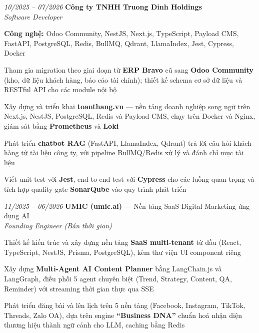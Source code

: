 \begin{twocolentry}{\textit{10/2025 -- 07/2026}}
    \textbf{Công ty TNHH Truong Dinh Holdings} \\[4pt]
    \textit{Software Developer}
\end{twocolentry}
\begin{onecolentry}
    \begin{highlights}
        \item \textbf{Công nghệ:} Odoo Community, NestJS, Next.js, TypeScript, Payload CMS, FastAPI, PostgreSQL, Redis, BullMQ, Qdrant, LlamaIndex, Jest, Cypress, Docker
        \item Tham gia migration theo giai đoạn từ \textbf{ERP Bravo} cũ sang \textbf{Odoo Community} (kho, dữ liệu khách hàng, báo cáo tài chính); thiết kế schema cơ sở dữ liệu và RESTful API cho các module nội bộ
        \item Xây dựng và triển khai \textbf{toanthang.vn} --- nền tảng doanh nghiệp song ngữ trên Next.js, NestJS, PostgreSQL, Redis và Payload CMS, chạy trên Docker và Nginx, giám sát bằng \textbf{Prometheus} và \textbf{Loki}
        \item Phát triển \textbf{chatbot RAG} (FastAPI, LlamaIndex, Qdrant) trả lời câu hỏi khách hàng từ tài liệu công ty, với pipeline BullMQ/Redis xử lý và đánh chỉ mục tài liệu
        \item Viết unit test với \textbf{Jest}, end-to-end test với \textbf{Cypress} cho các luồng quan trọng và tích hợp quality gate \textbf{SonarQube} vào quy trình phát triển
    \end{highlights}
\end{onecolentry}
\vspace{0.2 cm}

\begin{twocolentry}{\textit{11/2025 -- 06/2026}}
    \textbf{UMIC (umic.ai)} --- Nền tảng SaaS Digital Marketing ứng dụng AI \\[4pt]
    \textit{Founding Engineer (Bán thời gian)}
\end{twocolentry}
\begin{onecolentry}
    \begin{highlights}
        \item Thiết kế kiến trúc và xây dựng nền tảng \textbf{SaaS multi-tenant} từ đầu (React, TypeScript, NestJS, Prisma, PostgreSQL), kèm thư viện UI component riêng
        \item Xây dựng \textbf{Multi-Agent AI Content Planner} bằng LangChain.js và LangGraph, điều phối 5 agent chuyên biệt (Trend, Strategy, Content, QA, Reminder) với streaming thời gian thực qua SSE
        \item Phát triển đăng bài và lên lịch trên 5 nền tảng (Facebook, Instagram, TikTok, Threads, Zalo OA), dựa trên engine \textbf{``Business DNA''} chuẩn hoá nhận diện thương hiệu thành ngữ cảnh cho LLM, caching bằng Redis
    \end{highlights}
\end{onecolentry}
\vspace{0.2 cm}

